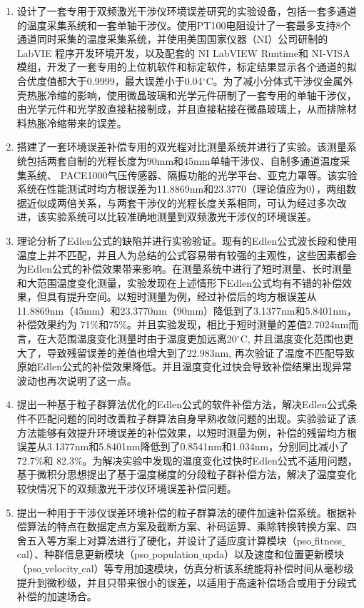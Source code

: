 \begin{enumerate}
    \item 设计了一套专用于双频激光干涉仪环境误差研究的实验设备，包括一套多通道的温度采集系统和一套单轴干涉仪。使用PT100电阻设计了一套最多支持8个通道同时采集的温度采集系统，并使用美国国家仪器（NI）公司研制的LabVIE 程序开发环境开发，以及配套的 NI LabVIEW Runtime和 NI-VISA模组，开发了一套专用的上位机软件和标定软件，标定结果显示各个通道的拟合优度值都大于0.9999，最大误差小于0.04$^{\circ} \mathrm{C}$。为了减小分体式干涉仪金属外壳热胀冷缩的影响，使用微晶玻璃和光学元件研制了一套专用的单轴干涉仪，由光学元件和光学胶直接粘接制成，并且直接粘接在微晶玻璃上，从而排除材料热胀冷缩带来的误差。
    \item 搭建了一套环境误差补偿专用的双光程对比测量系统并进行了实验。该测量系统包括两套自制的光程长度为90mm和45mm单轴干涉仪、自制多通道温度采集系统、 PACE1000气压传感器、隔振功能的光学平台、亚克力罩等。该实验系统在性能测试时均方根误差为11.8869nm和23.3770（理论值应为0），两组数据近似成两倍关系，与两套干涉仪的光程长度关系相同，可认为经过多次改进，该实验系统可以比较准确地测量到双频激光干涉仪的环境误差。
    \item 理论分析了Edlen公式的缺陷并进行实验验证。现有的Edlen公式波长段和使用温度上并不匹配，并且人为总结的公式容易带有较强的主观性，这些因素都会为Edlen公式的补偿效果带来影响。在测量系统中进行了短时测量、长时测量和大范围温度变化测量，实验发现在上述情形下Edlen公式均有不错的补偿效果，但具有提升空间。以短时测量为例，经过补偿后的均方根误差从11.8869nm（45mm）和23.3770nm（90mm）降低到了3.1377nm和5.8401nm，补偿效果约为 71$\%$和75$\%$。并且实验发现，相比于短时测量的差值2.7024nm而言，在大范围温度变化测量时由于温度更加远离20$^{\circ} \mathrm{C}$, 并且温度变化范围也更大了，导致残留误差的差值也增大到了22.983nm, 再次验证了温度不匹配导致原始Edlen公式的补偿效果降低。并且温度变化过快会导致补偿结果出现异常波动也再次说明了这一点。
    \item 提出一种基于粒子群算法优化的Edlen公式的软件补偿方法，解决Edlen公式条件不匹配问题的同时改善粒子群算法自身早熟收敛问题的出现。实验验证了该方法能够有效提升环境误差的补偿效果，以短时测量为例，补偿的残留均方根误差从3.1377nm和5.8401nm降低到了0.8541nm和1.034nm，分别同比减小了 72.7$\%$和 82.3$\%$。为解决实验中发现的温度变化过快时Edlen公式不适用问题，基于微积分思想提出了基于温度梯度的分段粒子群补偿方法，解决了温度变化较快情况下的双频激光干涉仪环境误差补偿问题。
    \item 提出一种用于干涉仪误差环境补偿的粒子群算法的硬件加速补偿系统。根据补偿算法的特点在数据定点方案及截断方案、补码运算、乘除转换转换方案、四舍五入等方案上对算法进行了硬化，并设计了适应度计算模块（pso$\_$fitness$\_$cal）、种群信息更新模块（pso$\_$population$\_$upda）以及速度和位置更新模块（pso$\_$velocity$\_$cal）等专用加速模块，仿真分析该系统能将补偿时间从毫秒级提升到微秒级，并且只带来很小的误差，以适用于高速补偿场合或用于分段式补偿的加速场合。
  \end{enumerate}

